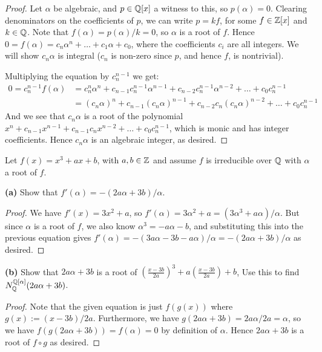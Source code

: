 \documentclass[11pt]{article}
\begin{document}
\begin{proof}
  Let $\alpha$ be algebraic, and $p \in \mathbb{Q}[x]$ a witness to this, so $p(\alpha) = 0$.
  Clearing denominators on the coefficients of $p$, we can write $p = kf$, for some $f \in \mathbb{Z}[x]$ and $k \in \mathbb{Q}$.
  Note that $f(\alpha) = p(\alpha)/k = 0$, so $\alpha$ is a root of $f$.
  Hence $0 = f(\alpha) = c_n\alpha^n + \dots + c_1\alpha + c_0$, where the coefficients $c_i$ are all integers.
  We will show $c_n\alpha$ is integral ($c_n$ is non-zero since $p$, and hence $f$, is nontrivial).
  
  Multiplying the equation by $c_n^{n-1}$ we get:
  \begin{align*}
    0 = c_n^{n-1} f(\alpha)
    &= c_n^n\alpha^n + c_{n-1}c_n^{n-1}\alpha^{n-1} + c_{n-2}c_n^{n-1}\alpha^{n-2} + \dots + c_0c_n^{n-1} \\
    &= (c_n\alpha)^n + c_{n-1}(c_n\alpha)^{n-1} + c_{n-2}c_n(c_n\alpha)^{n-2} + \dots + c_0c_n^{n-1}
  \end{align*}
  And we see that $c_n\alpha$ is a root of the polynomial $x^n + c_{n-1}x^{n-1} + c_{n-1}c_nx^{n-2} + \dots + c_0 c_n^{n-1}$, which is monic and has integer coefficients.
  Hence $c_n\alpha$ is an algebraic integer, as desired.
\end{proof}


Let $f(x) = x^3 + ax + b$, with $a,b \in \mathbb{Z}$ and assume $f$ is irreducible over $\mathbb{Q}$ with $\alpha$ a root of $f$.

\textbf{(a)} Show that $f'(\alpha) = -(2a\alpha + 3b)/\alpha$.

\begin{proof}
  We have $f'(x) = 3x^2 + a$, so $f'(\alpha) = 3\alpha^2 + a = (3\alpha^3 + a\alpha)/\alpha$.
  But since $\alpha$ is a root of $f$, we also know $\alpha^3 = -a\alpha - b$, and substituting this into the previous equation gives $f'(\alpha) = -(3a\alpha - 3b - a\alpha)/\alpha = -(2a\alpha + 3b)/\alpha$ as desired.
\end{proof}

\textbf{(b)} Show that $2a\alpha+3b$ is a root of $(\frac{x-3b}{2a})^3+a(\frac{x-3b}{2a})+b$, Use this to find $N_{\mathbb{Q}}^{\mathbb{Q}[\alpha]}(2a\alpha+3b)$.

\begin{proof}
  Note that the given equation is just $f(g(x))$ where $g(x):=(x-3b)/2a$.
  Furthermore, we have $g(2a\alpha+3b)=2a\alpha/2a=\alpha$, so we have $f(g(2a\alpha+3b)) = f(\alpha) = 0$ by definition of $\alpha$.
  Hence $2a\alpha+3b$ is a root of $f \circ g$ as desired.
\end{proof}
\end{document}
